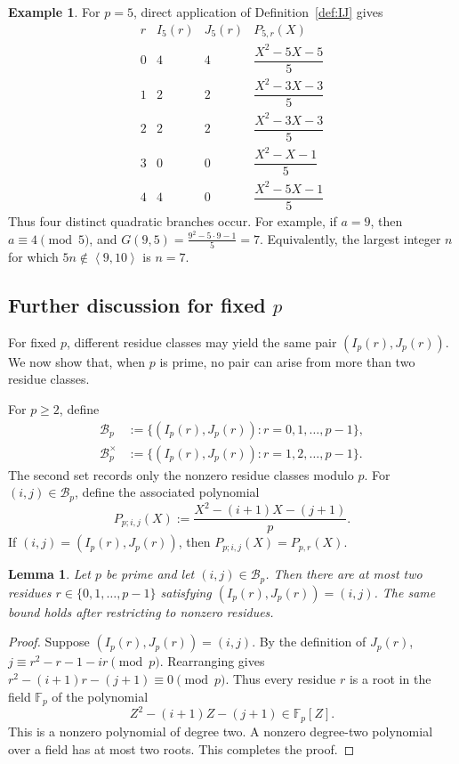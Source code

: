 \documentclass[reqno, 12pt]{article}
\numberwithin{equation}{section}
\newtheorem{lemma}[theorem]{Lemma}
\theoremstyle{definition}
\newtheorem{example}[theorem]{Example}
\newcommand{\FF}{\mathbb F}
\newcommand{\cB}{\mathcal B}
\newcommand{\gen}[1]{\left\langle #1\right\rangle}
\begin{document}
\begin{example}\label{ex:p=5}
For $p=5$, direct application of Definition~\ref{def:IJ} gives
\[
\begin{array}{c|cc|c}
 r & I_5(r) & J_5(r) & P_{5,r}(X)\\ \hline
 0 & 4 & 4 & \dfrac{X^2-5X-5}{5}\\[4pt]
 1 & 2 & 2 & \dfrac{X^2-3X-3}{5}\\[4pt]
 2 & 2 & 2 & \dfrac{X^2-3X-3}{5}\\[4pt]
 3 & 0 & 0 & \dfrac{X^2-X-1}{5}\\[4pt]
 4 & 4 & 0 & \dfrac{X^2-5X-1}{5}
\end{array}
\]
Thus four distinct quadratic branches occur.  For example, if $a=9$, then
$a\equiv4\pmod5$, and $G(9,5)=\frac{9^2-5\cdot9-1}{5}=7$. Equivalently, the largest integer $n$ for which $5n\notin\gen{9,10}$ is $n=7$.
\end{example}

\subsection{Further discussion for fixed $p$}\label{sec:branches}

For fixed $p$, different residue classes may yield the same pair
$(I_p(r),J_p(r))$.  We now show that, when $p$ is prime, no pair can arise
from more than two residue classes.  

For $p\ge2$, define
\begin{align*}
 \cB_p&:=\{(I_p(r),J_p(r)):r=0,1,\ldots,p-1\},\\
 \cB_p^{\times}&:=\{(I_p(r),J_p(r)):r=1,2,\ldots,p-1\}.
\end{align*}
The second set records only the nonzero residue classes modulo $p$.
For $(i,j)\in\cB_p$, define the associated polynomial
$$P_{p;i,j}(X):=\frac{X^2-(i+1)X-(j+1)}{p}.$$
If $(i,j)=(I_p(r),J_p(r))$, then $P_{p;i,j}(X)=P_{p,r}(X)$.

\begin{lemma}\label{lem:fiber-two}
Let $p$ be prime and let $(i,j)\in\cB_p$.  Then there are at most two
residues $r\in\{0,1,\ldots,p-1\}$ satisfying $(I_p(r),J_p(r))=(i,j)$.
The same bound holds after restricting to nonzero residues.
\end{lemma}
\begin{proof}
Suppose $(I_p(r),J_p(r))=(i,j)$.  By the definition of $J_p(r)$, $j\equiv r^2-r-1-ir\pmod p$.
Rearranging gives $r^2-(i+1)r-(j+1)\equiv0\pmod p$.
Thus every residue $r$ is a root in the field $\FF_p$ of the polynomial
\[
   Z^2-(i+1)Z-(j+1)\in\FF_p[Z].
\]
This is a nonzero polynomial of degree two.  A nonzero degree-two polynomial over a field has at most two roots.
This completes the proof.
\end{proof}
\end{document}
